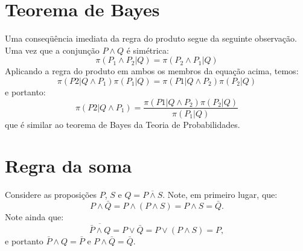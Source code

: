 \section{Teorema de Bayes}\clarificationneeded\newline
Uma conseqüência imediata da regra do produto segue da seguinte observação. Uma vez que a conjunção $P\wedge Q$ é simétrica:
\[
 \pi(P_1\wedge P_2| Q) = \pi(P_2\wedge P_1 | Q) 
\]
Aplicando a regra do produto em ambos os membros da equação acima, temos:
\[
 \pi(P2 | Q \wedge P_1) \pi(P_1| Q) = \pi(P1 | Q \wedge P_2) \pi(P_2| Q)
\]
e portanto:
\begin{equation}
 \label{eq:regradebayes}
 \pi(P2 | Q \wedge P_1)  = \frac{\pi(P1 | Q \wedge P_2) \pi(P_2| Q)}{\pi(P_1| Q)}
\end{equation}
que é similar ao teorema de Bayes da Teoria de Probabilidades.

\section{Regra da soma}\clarificationneeded\newline
Considere as proposições $P$, $S$ e $Q = \overline{P\wedge S}$. Note, em primeiro lugar, que: 
\[
  P\wedge\bar{Q} = P \wedge (P \wedge S) = P \wedge S = \bar{Q}.
\]
Note ainda que:
\[
 \overline{\bar{P}\wedge Q} = P \vee \bar{Q} = P \vee (P \wedge S) = P,
\]
e portanto $\bar{P}\wedge Q = \bar{P}$ e $P\wedge\bar{Q} = \bar{Q}$.

